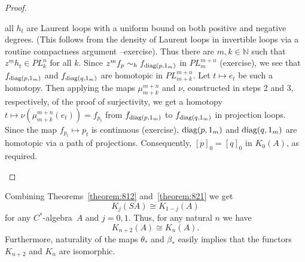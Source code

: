 \documentclass{book}
\def\cstar{\(C^*\)-algebra}
\def\diag{\textnormal{diag}}
\begin{document}
\begin{proof}
\begin{enumerate}[label={}]
    all \(h_t\) are Laurent loops with a uniform bound on both positive and negative degrees. (This follows from the density of  Laurent loops in invertible loops via a routine compactness argument --exercise).
    Thus there are \(m,k\in\mathbb{N}\) such that \(z^m h_t\in PL_k^n\) for all \(k\).
    Since \(z^m f_p\sim_h f_{\diag(p,1_m)}\) in \(PL_m^{m+n}\) (exercise), we see that \(f_{\diag(p,1_m)}\)
    and \(f_{\diag(q,1_m)}\) are homotopic in \(PL_{m+k}^{m+n}\). Let \(t\mapsto e_t\) be such a homotopy.
    Then applying the maps \(\mu_{m+k}^{m+n}\) and \(\nu\), constructed in steps 2 and 3, respectively, of the proof of surjectivity, we get a homotopy \(t\mapsto \nu(\mu_{m+k}^{m+n}(e_t))=f_{p_t}\) from \(f_{\diag(p,1_m)}\) to \(f_{\diag(q,1_m)}\) in projection loops.
    Since the map \(f_{p_t}\mapsto p_t\) is continuous (exercise), \(\diag(p,1_m)\) and \(\diag(q,1_m)\) are homotopic via a path of projections. Consequently, \({[p]}_0={[q]}_0\) in \(K_0(A)\), as required.
  \end{enumerate}
\end{proof}
Combining Theorems~\ref{theorem:812} and~\ref{theorem:821} we get
\[
  K_j(S A)\cong K_{1-j}(A)
\]
for any \cstar\ \(A\) and \(j=0,1\). Thus, for any natural \(n\) we have
\[
  K_{n+2}(A)\cong K_n(A).
\]
Furthermore, naturality of the maps \(\theta_*\) and \(\beta_*\) easily implies that the functors \(K_{n+2}\) and \(K_n\) are isomorphic.
\end{document}
